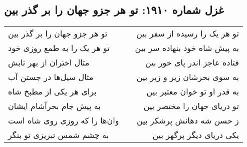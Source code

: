\begin{center}
\section*{غزل شماره ۱۹۱۰: تو هر جزو جهان را بر گذر بین}
\label{sec:1910}
\begin{longtable}{l p{0.5cm} r}
تو هر جزو جهان را بر گذر بین
&&
تو هر یک را رسیده از سفر بین
\\
تو هر یک را به طمع روزی خود
&&
به پیش شاه خود بنهاده سر بین
\\
مثال اختران از بهر تابش
&&
فتاده عاجز اندر پای خور بین
\\
مثال سیل‌ها در جستن آب
&&
به سوی بحرشان زیر و زبر بین
\\
برای هر یکی از مطبخ شاه
&&
به قدر او تو خوان معتبر بین
\\
به پیش جام بحرآشام ایشان
&&
تو دریای جهان را مختصر بین
\\
وان‌ها را که روزی روی شاه است
&&
ز حسن شه دهانش پرشکر بین
\\
به چشم شمس تبریزی تو بنگر
&&
یکی دریای دیگر پرگهر بین
\\
\end{longtable}
\end{center}

